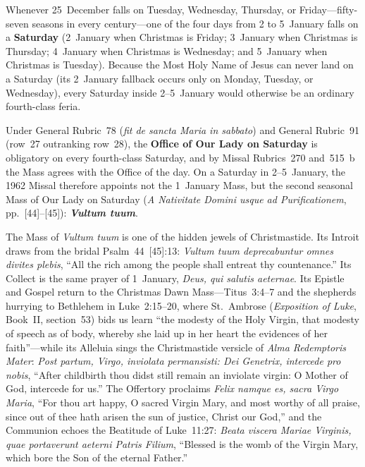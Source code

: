 Whenever 25~December falls on Tuesday, Wednesday, Thursday, or Friday---fifty-seven
seasons in every century---one of the four days from 2 to 5~January falls on a
\textbf{Saturday} (2~January when Christmas is Friday; 3~January when Christmas
is Thursday; 4~January when Christmas is Wednesday; and 5~January when
Christmas is Tuesday). Because the Most Holy Name of Jesus can never land on a
Saturday (its 2~January fallback occurs only on Monday, Tuesday, or Wednesday),
every Saturday inside 2--5~January would otherwise be an ordinary fourth-class
feria.

Under General Rubric~78 (\textit{fit de sancta Maria in sabbato}) and General
Rubric~91 (row~27 outranking row~28), the \textbf{Office of Our Lady on
Saturday} is obligatory on every fourth-class Saturday, and by Missal
Rubrics~270 and~515~b the Mass agrees with the Office of the day. On a Saturday
in 2--5~January, the 1962 Missal therefore appoints not the 1~January Mass, but
the second seasonal Mass of Our Lady on Saturday (\textit{A Nativitate Domini
usque ad Purificationem}, pp.~[44]--[45]): \textbf{\textit{Vultum tuum}}.

The Mass of \textit{Vultum tuum} is one of the hidden jewels of Christmastide.
Its Introit draws from the bridal Psalm~44~[45]:13: \textit{Vultum tuum
deprecabuntur omnes divites plebis}, ``All the rich among the people shall
entreat thy countenance.'' Its Collect is the same prayer of 1~January,
\textit{Deus, qui salutis aeternae}. Its Epistle and Gospel return to the
Christmas Dawn Mass---Titus~3:4--7 and the shepherds hurrying to Bethlehem in
Luke~2:15--20, where St.~Ambrose (\textit{Exposition of Luke}, Book~II,
section~53) bids us learn ``the modesty of the Holy Virgin, that modesty of
speech as of body, whereby she laid up in her heart the evidences of her
faith''---while its Alleluia sings the Christmastide versicle of \textit{Alma
Redemptoris Mater}: \textit{Post partum, Virgo, inviolata permansisti: Dei
Genetrix, intercede pro nobis}, ``After childbirth thou didst still remain an
inviolate virgin: O Mother of God, intercede for us.'' The Offertory proclaims
\textit{Felix namque es, sacra Virgo Maria}, ``For thou art happy, O sacred
Virgin Mary, and most worthy of all praise, since out of thee hath arisen the
sun of justice, Christ our God,'' and the Communion echoes the Beatitude of
Luke~11:27: \textit{Beata viscera Mariae Virginis, quae portaverunt aeterni
Patris Filium}, ``Blessed is the womb of the Virgin Mary, which bore the Son of
the eternal Father.''

